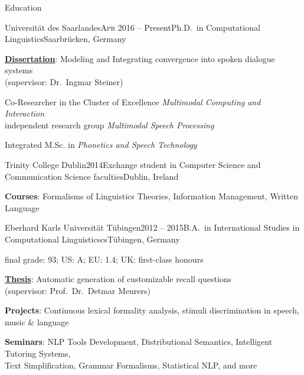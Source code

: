 \documentclass{resume} %
\begin{document}
\begin{rSection}{Education}

\begin{rSubsection}{Universität des Saarlandes}{\textsc{Apr} 2016 -- Present}{Ph.D.\ in Computational Linguistics}{Saarbrücken, Germany} %
	\setlength{\itemindent}{.7cm}
		
	\item \textbf{\underline{Dissertation}}: Modeling and Integrating convergence into spoken dialogue systems \\\hspace*{.7cm}(supervisor: Dr.\ Ingmar Steiner)

	\item Co-Researcher in the Cluster of Excellence \textit{Multimodal Computing and Interaction}
	\\\hspace*{.7cm}independent research group \textit{Multimodal Speech Processing}
	
	\item Integrated M.Sc. in \textit{Phonetics and Speech Technology}
\end{rSubsection}

\begin{rSubsection}{Trinity College Dublin}{2014}{Exchange student in Computer Science and Communication Science faculties}{Dublin, Ireland}
	\setlength{\itemindent}{.7cm}
	
	\item \textbf{Courses}: Formalisms of Linguistics Theories, Information Management, Written Language
	
\end{rSubsection}

\begin{rSubsection}{Eberhard Karls Universität Tübingen}{2012 -- 2015}{B.A.\ in International Studies in Computational Linguisticscs}{Tübingen, Germany}
	
\vspace*{-.2cm}
\item[]{\footnotesize final grade: 93; US: A; EU: 1.4; UK: first-class honours}
\vspace*{.2cm}

	\setlength{\itemindent}{.7cm}
	
	\item \textbf{\underline{Thesis}}: Automatic generation of customizable recall questions
	\\\hspace*{.7cm}(supervisor: Prof.\ Dr.\ Detmar Meurers)
	
	\item \textbf{Projects}: Continuous lexical formality analysis, stimuli discrimination in speech, music \& language
	
	\item \textbf{Seminars}: NLP Tools Development, Distributional Semantics, Intelligent Tutoring Systems, \\\hspace*{.7cm}Text Simplification, Grammar Formalisms, Statistical NLP, and more
\end{rSubsection}

\end{rSection}
\end{document}
